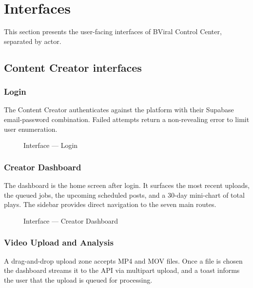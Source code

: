 \section{Interfaces}
\label{sec:interfaces}

This section presents the user-facing interfaces of BViral Control Center, separated by
actor.

\subsection{Content Creator interfaces}
\label{sec:creator_ui}

\subsubsection{Login}
\label{sec:ui_login}
The Content Creator authenticates against the platform with their Supabase email-password
combination. Failed attempts return a non-revealing error to limit user enumeration.

\begin{figure}[H]
  \centering
  \caption{Interface --- Login}
  \label{fig:ui_login}
\end{figure}

\subsubsection{Creator Dashboard}
\label{sec:ui_dashboard}
The dashboard is the home screen after login. It surfaces the most recent uploads, the
queued jobs, the upcoming scheduled posts, and a 30-day mini-chart of total plays. The
sidebar provides direct navigation to the seven main routes.

\begin{figure}[H]
  \centering
  \caption{Interface --- Creator Dashboard}
  \label{fig:ui_dashboard}
\end{figure}

\subsubsection{Video Upload and Analysis}
\label{sec:ui_upload}
A drag-and-drop upload zone accepts MP4 and MOV files. Once a file is chosen the dashboard
streams it to the API via multipart upload, and a toast informs the user that the upload
is queued for processing.

